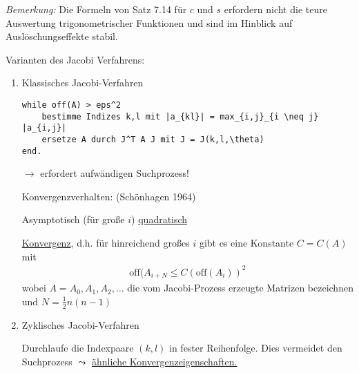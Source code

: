 \documentclass[%
a4paper,
11pt,		%
]
{scrartcl}
\newcommand{\off}{\text{off}}
\theoremstyle{plain}
\theoremstyle{plain}
\theoremstyle{plain}
\theoremstyle{plain}
\begin{document}
\textit{Bemerkung:} Die Formeln von Satz 7.14 %
für $c$ und $s$ erfordern nicht die teure Auswertung trigonometrischer Funktionen und sind im Hinblick auf Auslöschungseffekte stabil.

Varianten des Jacobi Verfahrens:
\begin{enumerate}
\item Klassisches Jacobi-Verfahren
\begin{verbatim}
while off(A) > eps^2
    bestimme Indizes k,l mit |a_{kl}| = max_{i,j}_{i \neq j} |a_{i,j}|
    ersetze A durch J^T A J mit J = J(k,l,\theta)
end.
\end{verbatim}
$\to$ erfordert aufwändigen Suchprozess!

Konvergenzverhalten: (Schönhagen 1964)

Asymptotisch (für große $i$) \uline{quadratisch}

\uline{Konvergenz}, d.h. für hinreichend großes $i$ gibt es eine Konstante $C=C(A)$ mit 
\begin{align*}
\off(A_{i+N} \leq C(\off(A_i))^2
\end{align*}
wobei $A = A_0,A_1,A_2, \dots $ die vom Jacobi-Prozess erzeugte Matrizen bezeichnen und $N = \frac{1}{2}n(n-1)$

\item Zyklisches Jacobi-Verfahren %

Durchlaufe die Indexpaare $(k,l)$ in fester Reihenfolge. Dies vermeidet den Suchprozess $\leadsto$ \uline{ähnliche Konvergenzeigenschaften.}
\end{enumerate}
\end{document}
